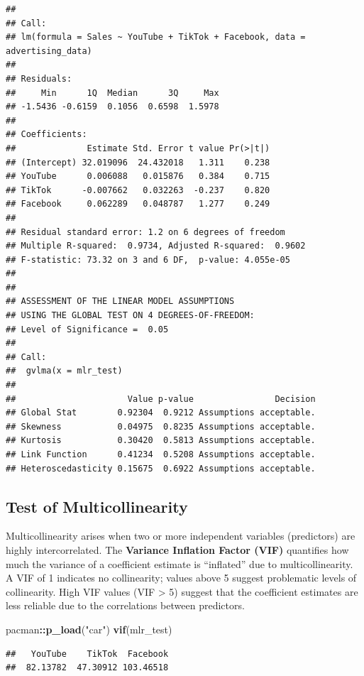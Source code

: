 \documentclass[
]{article}
\newenvironment{Shaded}{\begin{snugshade}}{\end{snugshade}}
\newcommand{\FunctionTok}[1]{\textcolor[rgb]{0.13,0.29,0.53}{\textbf{#1}}}
\newcommand{\NormalTok}[1]{#1}
\newcommand{\SpecialCharTok}[1]{\textcolor[rgb]{0.81,0.36,0.00}{\textbf{#1}}}
\newcommand{\StringTok}[1]{\textcolor[rgb]{0.31,0.60,0.02}{#1}}
\begin{document}
\begin{verbatim}
## 
## Call:
## lm(formula = Sales ~ YouTube + TikTok + Facebook, data = advertising_data)
## 
## Residuals:
##     Min      1Q  Median      3Q     Max 
## -1.5436 -0.6159  0.1056  0.6598  1.5978 
## 
## Coefficients:
##              Estimate Std. Error t value Pr(>|t|)
## (Intercept) 32.019096  24.432018   1.311    0.238
## YouTube      0.006088   0.015876   0.384    0.715
## TikTok      -0.007662   0.032263  -0.237    0.820
## Facebook     0.062289   0.048787   1.277    0.249
## 
## Residual standard error: 1.2 on 6 degrees of freedom
## Multiple R-squared:  0.9734, Adjusted R-squared:  0.9602 
## F-statistic: 73.32 on 3 and 6 DF,  p-value: 4.055e-05
## 
## 
## ASSESSMENT OF THE LINEAR MODEL ASSUMPTIONS
## USING THE GLOBAL TEST ON 4 DEGREES-OF-FREEDOM:
## Level of Significance =  0.05 
## 
## Call:
##  gvlma(x = mlr_test) 
## 
##                      Value p-value                Decision
## Global Stat        0.92304  0.9212 Assumptions acceptable.
## Skewness           0.04975  0.8235 Assumptions acceptable.
## Kurtosis           0.30420  0.5813 Assumptions acceptable.
## Link Function      0.41234  0.5208 Assumptions acceptable.
## Heteroscedasticity 0.15675  0.6922 Assumptions acceptable.
\end{verbatim}

\subsection{Test of Multicollinearity}\label{test-of-multicollinearity}

Multicollinearity arises when two or more independent variables
(predictors) are highly intercorrelated. The \textbf{Variance Inflation
Factor (VIF)} quantifies how much the variance of a coefficient estimate
is ``inflated'' due to multicollinearity. A VIF of 1 indicates no
collinearity; values above 5 suggest problematic levels of collinearity.
High VIF values (VIF \textgreater{} 5) suggest that the coefficient
estimates are less reliable due to the correlations between predictors.

\begin{Shaded}
\begin{Highlighting}[]
\NormalTok{pacman}\SpecialCharTok{::}\FunctionTok{p\_load}\NormalTok{(}\StringTok{"car"}\NormalTok{)}
\FunctionTok{vif}\NormalTok{(mlr\_test)}
\end{Highlighting}
\end{Shaded}

\begin{verbatim}
##   YouTube    TikTok  Facebook 
##  82.13782  47.30912 103.46518
\end{verbatim}
\end{document}
